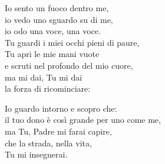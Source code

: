 
\strofa Io sento un fuoco dentro me,\\
io vedo uno sguardo su di me,\\
io odo una voce, una voce.\\
Tu guardi i miei occhi pieni di paure,\\
Tu apri le mie mani vuote\\
e scruti nel profondo del mio cuore,\\
ma mi dai, Tu mi dai\\
la forza di ricominciare:

\spazio


\spazio

\strofa Io guardo intorno e scopro che:\\
il tuo dono è così grande per uno come me,\\
ma Tu, Padre mi farai capire,\\
che la strada, nella vita,\\
Tu mi insegnerai.

\spazio

